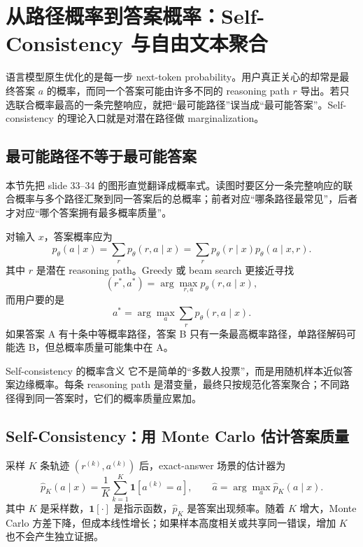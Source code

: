 \section{从路径概率到答案概率：Self-Consistency 与自由文本聚合}

语言模型原生优化的是每一步 next-token probability。用户真正关心的却常是最终答案 $a$ 的概率，而同一个答案可能由许多不同的 reasoning path $r$ 导出。若只选联合概率最高的一条完整响应，就把“最可能路径”误当成“最可能答案”。Self-consistency 的理论入口就是对潜在路径做 marginalization。

\subsection{最可能路径不等于最可能答案}

本节先把 slide 33--34 的图形直觉翻译成概率式。读图时要区分一条完整响应的联合概率与多个路径汇聚到同一答案后的总概率；前者对应“哪条路径最常见”，后者才对应“哪个答案拥有最多概率质量”。

对输入 $x$，答案概率应为
\[
p_\theta(a\mid x)=\sum_{r}p_\theta(r,a\mid x)
=\sum_r p_\theta(r\mid x)p_\theta(a\mid x,r).
\]
其中 $r$ 是潜在 reasoning path。Greedy 或 beam search 更接近寻找
\[
(r^*,a^*)=\arg\max_{r,a}p_\theta(r,a\mid x),
\]
而用户要的是
\[
a^*=\arg\max_a\sum_r p_\theta(r,a\mid x).
\]
如果答案 A 有十条中等概率路径，答案 B 只有一条最高概率路径，单路径解码可能选 B，但总概率质量可能集中在 A。



\begin{importantbox}{Self-consistency 的概率含义}
它不是简单的“多数人投票”，而是用随机样本近似答案边缘概率。每条 reasoning path 是潜变量，最终只按规范化答案聚合；不同路径得到同一答案时，它们的概率质量应累加。
\end{importantbox}


\subsection{Self-Consistency：用 Monte Carlo 估计答案质量}

采样 $K$ 条轨迹 $(r^{(k)},a^{(k)})$ 后，exact-answer 场景的估计器为
\[
\widehat p_K(a\mid x)=\frac{1}{K}\sum_{k=1}^{K}\mathbf 1[a^{(k)}=a],
\qquad
\hat a=\arg\max_a\widehat p_K(a\mid x).
\]
其中 $K$ 是采样数，$\mathbf 1[\cdot]$ 是指示函数，$\widehat p_K$ 是答案出现频率。随着 $K$ 增大，Monte Carlo 方差下降，但成本线性增长；如果样本高度相关或共享同一错误，增加 $K$ 也不会产生独立证据。

